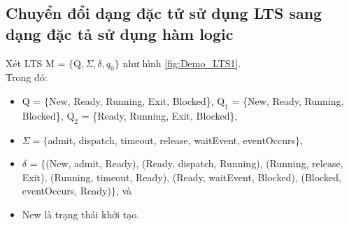 \documentclass[a4paper,13pt,oneside,openany]{book}
\begin{document}
\begin{flushleft}
	\section{Chuyển đổi dạng đặc tử sử dụng LTS sang dạng đặc tả sử dụng hàm logic}
	Xét LTS M = $\{\textrm{Q}, \Sigma, \delta, q_0\}$ như hình \ref{fig:Demo_LTS1}.\\
	Trong đó:
	\begin{itemize}
		\item Q = $\{$New, Ready, Running, Exit, Blocked\}, $\textrm{Q}_1$ = \{New, Ready, Running, Blocked\}, $\textrm{Q}_2$ = \{Ready, Running, Exit, Blocked\},
		\item $\Sigma = \{$admit, dispatch, timeout, release, waitEvent, eventOccurs$\}$,
		\item $\delta$ = $\{$(New, admit, Ready), (Ready, dispatch, Running), (Running, release, Exit), (Running, timeout, Ready), (Ready, waitEvent, Blocked), (Blocked, eventOccurs, Ready)$\}$, và
		\item New là trạng thái khởi tạo.
	\end{itemize}


\end{flushleft}
\end{document}
